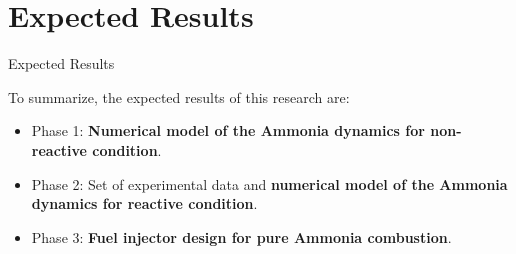 \section{Expected Results}

\begin{frame}{Expected Results}

    To summarize, the expected results of this research are:

    \begin{itemize}
        \item<2-> Phase 1: \textbf<2>{Numerical model of the Ammonia dynamics for non-reactive condition}.
        \item<3-> Phase 2: Set of experimental data and \textbf<3>{numerical model of the Ammonia dynamics for reactive condition}.
        \item<4-> Phase 3: \textbf<4>{Fuel injector design for pure Ammonia combustion}.
    \end{itemize}

    \begin{columns}[t, onlytextwidth]

        \begin{column}{0.28\textwidth}


        \end{column}

        \hfill

        \begin{column}{0.28\textwidth}



\end{column}
\end{columns}
\end{frame}
